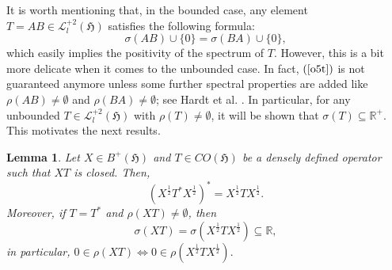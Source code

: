 \documentclass{amsart}
\newtheorem{lemma}[theorem]{Lemma}
\newcommand{\ifaf}{\Leftrightarrow}
\newcommand{\vide}{\emptyset}
\newcommand{\h}{\mathfrak{H}}
\newcommand{\adj}{^*}
\newcommand{\tstar}{T^{*}}
\newcommand{\half}{^{\frac{1}{2}}}
\newcommand{\R}{\mathbb{R}}
\newcommand{\rplus}{\mathbb{R^+}}
\newcommand{\inclu}{\subseteq}
\newcommand{\lplus}{B^{+}(\h)}
\newcommand{\ldeux}{\mathcal{L}_l^{+2}(\h)}
\numberwithin{equation}{section}
\begin{document}
 It is worth mentioning that, in the bounded case, any element $T= AB \in \ldeux$ satisfies the following formula:
\begin{equation}\label{o5t}
  \sigma(A  B) \cup \{0\} = \sigma(BA) \cup \{0\},
\end{equation}
which  easily implies the positivity of the spectrum of $T.$ However, this is a bit more delicate when it comes to the unbounded case. In fact,  $(\ref{o5t})$ is not guaranteed anymore   unless some further spectral properties  are added like    $\rho(AB) \neq \vide$ and $\rho(BA)\neq \vide$; see Hardt et al. \cite{hardt}.  In particular,  for any  unbounded $T \in  \ldeux$ with    $\rho(T)\neq \vide$, it will be shown that     $\sigma(T) \inclu \rplus$.  This motivates the next   results.


\begin{lemma}\label{avanttheospectral}Let $X \in \lplus$ and $T \in CO(\h)$ be a densely defined operator such that  $XT$ is closed.   Then,
      \begin{equation}\label{ma2oul01}
          (X\half T\adj  X\half  )\adj= X\half T X\half.
     \end{equation}
     Moreover,      if  $T=\tstar$ and   $\rho(XT) \neq \vide$, then
    \begin{equation}\label{ma2ouul2}
      \sigma(XT)  = \sigma(X\half T X\half)  \inclu \R,
    \end{equation}
   in particular,  $0 \in \rho(XT) \ifaf 0 \in \rho(X\half T X\half).$
\end{lemma}
\end{document}
